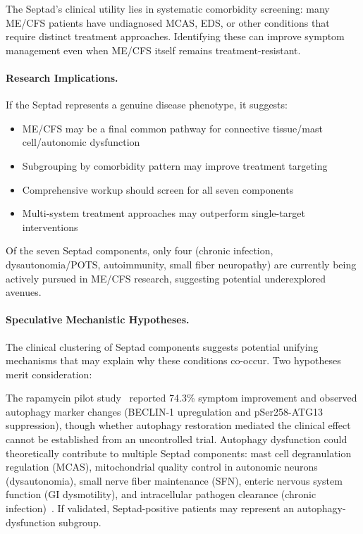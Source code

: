 The Septad's clinical utility lies in systematic comorbidity screening: many ME/CFS patients have undiagnosed MCAS, EDS, or other conditions that require distinct treatment approaches. Identifying these can improve symptom management even when ME/CFS itself remains treatment-resistant.

\paragraph{Research Implications.}
If the Septad represents a genuine disease phenotype, it suggests:
\begin{itemize}
    \item ME/CFS may be a final common pathway for connective tissue/mast cell/autonomic dysfunction
    \item Subgrouping by comorbidity pattern may improve treatment targeting
    \item Comprehensive workup should screen for all seven components
    \item Multi-system treatment approaches may outperform single-target interventions
\end{itemize}

Of the seven Septad components, only four (chronic infection, dysautonomia/POTS, autoimmunity, small fiber neuropathy) are currently being actively pursued in ME/CFS research, suggesting potential underexplored avenues.

\paragraph{Speculative Mechanistic Hypotheses.}
The clinical clustering of Septad components suggests potential unifying mechanisms that may explain why these conditions co-occur. Two hypotheses merit consideration:

\begin{hypothesis}
\label{hyp:autophagy-septad}
The rapamycin pilot study~\cite{Ruan2025rapamycin} reported 74.3\% symptom improvement and observed autophagy marker changes (BECLIN-1 upregulation and pSer258-ATG13 suppression), though whether autophagy restoration mediated the clinical effect cannot be established from an uncontrolled trial. Autophagy dysfunction could theoretically contribute to multiple Septad components: mast cell degranulation regulation (MCAS), mitochondrial quality control in autonomic neurons (dysautonomia), small nerve fiber maintenance (SFN), enteric nervous system function (GI dysmotility), and intracellular pathogen clearance (chronic infection)~\cite{Ruan2025rapamycin}. If validated, Septad-positive patients may represent an autophagy-dysfunction subgroup.
\end{hypothesis}

